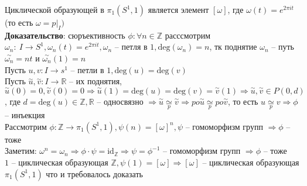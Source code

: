 	Циклической образующей в ${\pi}_1 (S^1, 1)$ является элемент $[\omega]$, где ${\omega} (t) = e^{2\pi it}$ (то есть $\omega = {p|}_I)$\\
	\textbf{Доказательство}: сюръективность $\phi: \forall n\in \mathbb{Z}$ расссмотрим ${\omega}_n:\ I \rightarrow S^1, {\omega}_n (t) = e^{2\pi it}, {\omega}_n$ -- петля в $1, \text{deg}({\omega}_n) = n$, тк поднятие ${\omega}_n$ -- путь $\overset{\sim}{{\omega}_n} = nt$ и $\overset{\sim}{{\omega}_n} (1) = n$\\
	Пусть $u,v: I \rightarrow s^1$ -- петли в $1, \text{deg}(u) = \text{deg}(v)$\\
	Пусть $\overset{\sim}{u},\overset{\sim}{v}: I \rightarrow \mathbb{R}$ -- их поднятия, $\overset{\sim}{u} (0) = 0, \overset{\sim}{v} (0) = 0 \Rightarrow \overset{\sim}{u} (1) = \text{deg}(u) = \text{deg}(v) = \overset{\sim}{v} (1) \Rightarrow \overset{\sim}{u}, \overset{\sim}{v} \in P(0,d)$, где $d = \text{deg}(u) \in \mathbb{Z}, \mathbb{R}$ -- односвязно $\Rightarrow \overset{\sim}{u} \underset{p}{\simeq} \overset{\sim}{v} \Rightarrow po \overset{\sim}{u} \underset{p}{\simeq} po \overset{\sim}{v}$, то есть $u \underset{p}{\simeq} v \Rightarrow \phi$ -- инъекция\\
	Рассмотрим $\phi: \mathbb{Z} \rightarrow {\pi}_1 (S^1, 1), \psi (n) = [\omega]^n , \psi$ -- гомоморфизм групп $\Rightarrow \phi$ -- тоже\\
	Заметим: ${\omega}^n = {\omega}_n \Rightarrow \phi \cdot \psi =  \text{id}_{\mathbb{Z}} \Rightarrow \psi = {\phi}^{-1}$ -- гомоморфизм групп $\Rightarrow \phi$ -- тоже\\
	$1$ -- циклическая образующая $\mathbb{Z}, \psi (1) = [\omega] \Rightarrow [\omega]$ -- циклическая образующая ${\pi}_1 (S^1, 1)$ что и требовалось доказать
	


\newpage
